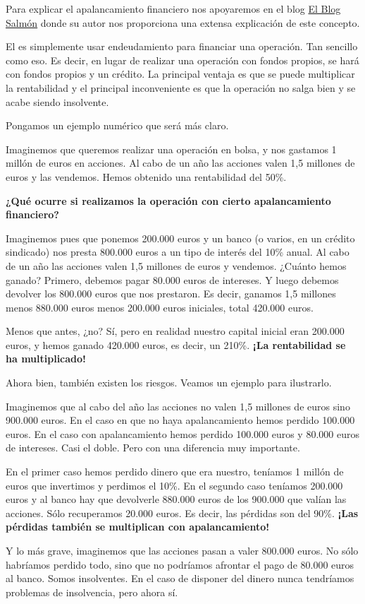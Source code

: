 \documentclass[nochap,palatino,shortheader]{apuntes}
\begin{document}
Para explicar el apalancamiento financiero nos apoyaremos en el blog \href{http://www.elblogsalmon.com/conceptos-de-economia/que-es-el-apalancamiento-financiero}{El Blog Salmón} donde su autor nos proporciona una extensa explicación de este concepto.

El  es simplemente usar endeudamiento para financiar una operación. Tan sencillo como eso. Es decir, en lugar de realizar una operación con fondos propios, se hará con fondos propios y un crédito. La principal ventaja es que se puede multiplicar la rentabilidad y el principal inconveniente es que la operación no salga bien y se acabe siendo insolvente.

Pongamos un ejemplo numérico que será más claro.

\begin{example}
Imaginemos que queremos realizar una operación en bolsa, y nos gastamos 1 millón de euros en acciones. Al cabo de un año las acciones valen 1,5 millones de euros y las vendemos. Hemos obtenido una rentabilidad del 50\%.

\textbf{¿Qué ocurre si realizamos la operación con cierto apalancamiento financiero?}

Imaginemos pues que ponemos 200.000 euros y un banco (o varios, en un crédito sindicado) nos presta 800.000 euros a un tipo de interés del 10\% anual. Al cabo de un año las acciones valen 1,5 millones de euros y vendemos. ¿Cuánto hemos ganado? Primero, debemos pagar 80.000 euros de intereses. Y luego debemos devolver los 800.000 euros que nos prestaron. Es decir, ganamos 1,5 millones menos 880.000 euros menos 200.000 euros iniciales, total 420.000 euros.

Menos que antes, ¿no? Sí, pero en realidad nuestro capital inicial eran 200.000 euros, y hemos ganado 420.000 euros, es decir, un 210\%. \textbf{¡La rentabilidad se ha multiplicado!}
\end{example}

Ahora bien, también existen los riesgos. Veamos un ejemplo para ilustrarlo.

\begin{example}
Imaginemos que al cabo del año las acciones no valen 1,5 millones de euros sino 900.000 euros. En el caso en que no haya apalancamiento hemos perdido 100.000 euros. En el caso con apalancamiento hemos perdido 100.000 euros y 80.000 euros de intereses. Casi el doble. Pero con una diferencia muy importante.

En el primer caso hemos perdido dinero que era nuestro, teníamos 1 millón de euros que invertimos y perdimos el 10\%. En el segundo caso teníamos 200.000 euros y al banco hay que devolverle 880.000 euros de los 900.000 que valían las acciones. Sólo recuperamos 20.000 euros. Es decir, las pérdidas son del 90\%. \textbf{¡Las pérdidas también se multiplican con apalancamiento!}

Y lo más grave, imaginemos que las acciones pasan a valer 800.000 euros. No sólo habríamos perdido todo, sino que no podríamos afrontar el pago de 80.000 euros al banco. Somos insolventes. En el caso de disponer del dinero nunca tendríamos problemas de insolvencia, pero ahora sí.

\end{example}
\end{document}
